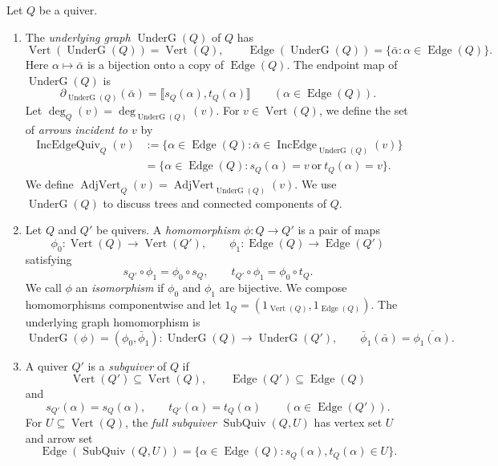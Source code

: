\begin{definition}\label{def:quiver-notions}
Let $Q$ be a quiver.
\begin{enumerate}[font=\itshape]
\item The \textit{underlying graph} $\operatorname{UnderG}(Q)$ of $Q$ has
\[
 \operatorname{Vert}(\operatorname{UnderG}(Q))=\operatorname{Vert}(Q),\qquad
 \operatorname{Edge}(\operatorname{UnderG}(Q))=\{\bar\alpha:\alpha\in\operatorname{Edge}(Q)\}.
\]
Here $\alpha\mapsto\bar\alpha$ is a bijection onto a copy of $\operatorname{Edge}(Q)$. The endpoint map of $\operatorname{UnderG}(Q)$ is
\[
 \partial_{\operatorname{UnderG}(Q)}(\bar\alpha)=\llbracket s_Q(\alpha),t_Q(\alpha)\rrbracket
 \qquad(\alpha\in\operatorname{Edge}(Q)).
\]
Let $\deg_Q(v)=\deg_{\operatorname{UnderG}(Q)}(v)$.
For $v\in\operatorname{Vert}(Q)$, we define the set of \textit{arrows incident to $v$} by
\[
\begin{aligned}
 \operatorname{IncEdgeQuiv}_Q(v)&:=\{\alpha\in\operatorname{Edge}(Q):\bar\alpha\in\operatorname{IncEdge}_{\operatorname{UnderG}(Q)}(v)\}\\
 &=\{\alpha\in\operatorname{Edge}(Q):s_Q(\alpha)=v\ \text{or}\ t_Q(\alpha)=v\}.
\end{aligned}
\]
We define $\operatorname{AdjVert}_Q(v)=\operatorname{AdjVert}_{\operatorname{UnderG}(Q)}(v)$.
We use $\operatorname{UnderG}(Q)$ to discuss trees and connected components of $Q$.
\item Let $Q$ and $Q'$ be quivers. A \textit{homomorphism} $\phi:Q\to Q'$ is a pair of maps
\[
 \phi_0:\operatorname{Vert}(Q)\longrightarrow\operatorname{Vert}(Q'),\qquad
 \phi_1:\operatorname{Edge}(Q)\longrightarrow\operatorname{Edge}(Q')
\]
satisfying
\[
 s_{Q'}\circ\phi_1=\phi_0\circ s_Q,\qquad
 t_{Q'}\circ\phi_1=\phi_0\circ t_Q.
\]
We call $\phi$ an \textit{isomorphism} if $\phi_0$ and $\phi_1$ are bijective.
We compose homomorphisms componentwise and let
$1_Q=(1_{\operatorname{Vert}(Q)},1_{\operatorname{Edge}(Q)})$.
The underlying graph homomorphism is
\[
 \operatorname{UnderG}(\phi)=(\phi_0,\bar\phi_1):
 \operatorname{UnderG}(Q)\longrightarrow\operatorname{UnderG}(Q'),\qquad
 \bar\phi_1(\bar\alpha)=\overline{\phi_1(\alpha)}.
\]
\item A quiver $Q'$ is a \textit{subquiver} of $Q$ if
\[
 \operatorname{Vert}(Q')\subseteq\operatorname{Vert}(Q),\qquad
 \operatorname{Edge}(Q')\subseteq\operatorname{Edge}(Q)
\]
and
\[
 s_{Q'}(\alpha)=s_Q(\alpha),\qquad t_{Q'}(\alpha)=t_Q(\alpha)
 \qquad(\alpha\in\operatorname{Edge}(Q')).
\]
For $U\subseteq\operatorname{Vert}(Q)$, the \textit{full subquiver} $\operatorname{SubQuiv}(Q,U)$
has vertex set $U$ and arrow set
\[
 \operatorname{Edge}(\operatorname{SubQuiv}(Q,U))
 =\{\alpha\in\operatorname{Edge}(Q):s_Q(\alpha),t_Q(\alpha)\in U\}.
\]
\end{enumerate}
\end{definition}

